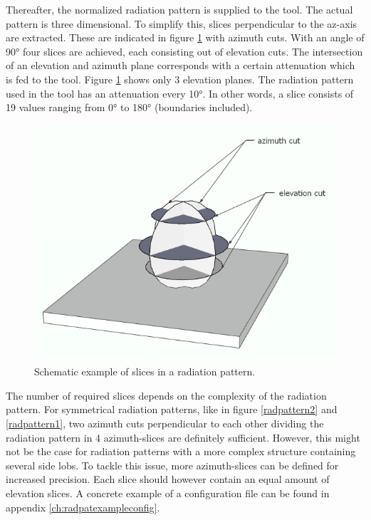 Thereafter, the normalized radiation pattern is supplied to the tool. The actual pattern is three dimensional. To simplify this,
slices perpendicular to the az-axis are extracted. These are indicated in figure \ref{fig:slicesOfPattern} with azimuth cuts. With
an angle of \ang{90} four slices are achieved, each consisting out of elevation cuts. The intersection of an elevation and azimuth plane 
corresponds with a certain attenuation which is fed to the tool. Figure \ref{fig:slicesOfPattern} shows only 3 elevation planes. The radiation pattern used in the tool 
has an attenuation every \ang{10}. In other words, a slice consists of 19 values ranging from \ang{0} to \ang{180} (boundaries included).

\begin{figure}[H]
\centering
  \includegraphics[width=\textwidth/3*2]{../images/3Dimages/slicesOfPattern.jpg}
  \caption{Schematic example of slices in a radiation pattern.}
  \label{fig:slicesOfPattern}
\end{figure}

The number of required slices depends on the complexity of the radiation pattern. For symmetrical radiation patterns, like 
in figure \ref{radpattern2} and \ref{radpattern1}, two azimuth cuts perpendicular to each other dividing the radiation pattern in 4 azimuth-slices 
are definitely sufficient. However, this might not be the case for radiation patterns with a more complex structure containing several  
side lobs. To tackle this issue, more azimuth-slices can be defined for increased precision. Each slice should however contain an equal amount 
of elevation slices.  A concrete example of a configuration file can be found in appendix \ref{ch:radpatexampleconfig}.
 
